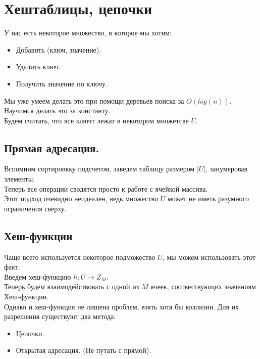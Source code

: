 \section{Хештаблицы, цепочки}%
\label{sec:Хештаблицы, цепочки}

У нас есть некоторое множество, в которое мы хотим:
\begin{itemize}
    \item Добавить (ключ, значение).
    \item Удалить ключ.
    \item Получить значение по ключу.
\end{itemize}

Мы уже умеем делать это при помощи деревьев поиска за $O(log(n))$. Научимся делать это за константу. \\
Будем считать, что все ключт лежат в некотором множетсве  $U$.

\subsection{Прямая адресация.}%
\label{sub:Прямая адресация.}

Вспомним сортировкку подсчетом, заведем таблицу размером $\lvert U \rvert$, занумеровав элементы. \\
Теперь все операции сводятся просто к работе с ячейкой массива. \\
Этот подход очевидно неидеален, ведь множество $U$ может не иметь разумного ограничения сверху. \\

\subsection{Хеш-функции}%
\label{sub:{Хеш-функции}}

Чаще всего используется некоторое подможество $U$, мы можем использовать этот факт. \\
Введем хеш-функцию $h: U \to Z_M$. \\
Теперь будем взаимодействовать с одной из $M$ ячеек, соотвествующих значениям Хеш-функции. \\
Однако и хеш-функция не лишена проблем, взять хотя бы коллизии. Для их разрешения существуют два метода: \\
 \begin{itemize}
    \item Цепочки.
    \item Открытая адресация. (Не путать с прямой).
\end{itemize}

